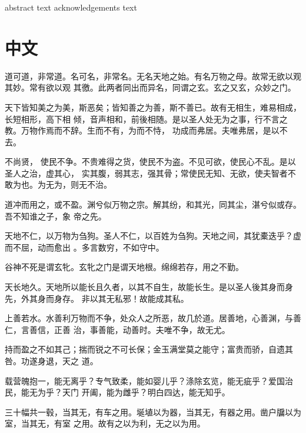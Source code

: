 \documentclass[11pt,a4paper,extrafontsizes,oldfontcommands,twoside]{dlutthesis}
\begin{document}
\frontmatter
abstract text
acknowledgements text
\tableofcontents
\mainmatter
\chapter{中文} %

道可道，非常道。名可名，非常名。无名天地之始。有名万物之母。故常无欲以观其妙。常有欲以观
其徼。此两者同出而异名，同谓之玄。玄之又玄，众妙之门。

天下皆知美之为美，斯恶矣；皆知善之为善，斯不善已。故有无相生，难易相成，长短相形，高下相
倾，音声相和，前後相随。是以圣人处无为之事，行不言之教。万物作焉而不辞。生而不有，为而不恃，
功成而弗居。夫唯弗居，是以不去。

不尚贤， 使民不争。不贵难得之货，使民不为盗。不见可欲，使民心不乱。是以圣人之治，虚其心，
实其腹，弱其志，强其骨；常使民无知、无欲，使夫智者不敢为也。为无为，则无不治。

道冲而用之，或不盈。渊兮似万物之宗。解其纷，和其光，同其尘，湛兮似或存。吾不知谁之子，象
帝之先。

天地不仁，以万物为刍狗。圣人不仁，以百姓为刍狗。天地之间，其犹橐迭乎？虚而不屈，动而愈出
。多言数穷，不如守中。

谷神不死是谓玄牝。玄牝之门是谓天地根。绵绵若存，用之不勤。

天长地久。天地所以能长且久者，以其不自生，故能长生。是以圣人後其身而身先，外其身而身存。
非以其无私邪！故能成其私。

上善若水。水善利万物而不争，处众人之所恶，故几於道。居善地，心善渊，与善仁，言善信，正善
治，事善能，动善时。夫唯不争，故无尤。

持而盈之不如其己；揣而锐之不可长保；金玉满堂莫之能守；富贵而骄，自遗其咎。功遂身退，天之
道。

载营魄抱一，能无离乎？专气致柔，能如婴儿乎？涤除玄览，能无疵乎？爱国治民，能无为乎？天门
开阖，能为雌乎？明白四达，能无知乎。

三十幅共一毂，当其无，有车之用。埏埴以为器，当其无，有器之用。凿户牖以为室，当其无，有室
之用。故有之以为利，无之以为用。
\end{document}
